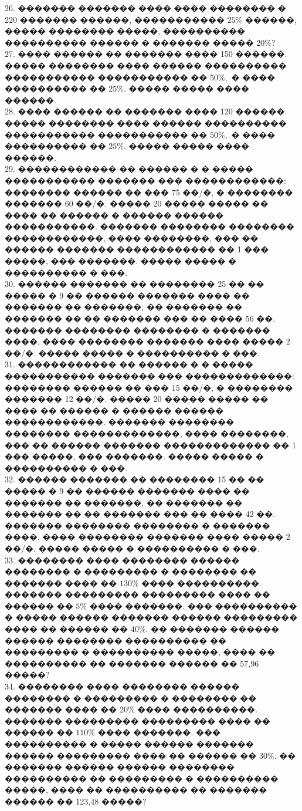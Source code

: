 \documentclass[12pt]{article}
\begin{document}
26. ������� ������� ���� ���� �������� � 220 ������� ������, ����������� $25\%$ ������, ����� �������� �����, ���������� ���������� ������ � ������� ����� $20\%?$\\
27. ���� ������ �� ������� ���� 150 ������. ����� �������� ���� ������ ���������� ����������� ����������� �� $50\%,$ � ���� ���������� �� $25\%.$ ����� ����� ���� ������.\\
28. ���� ������ �� ������� ���� 120 ������. ����� �������� ���� ������ ���������� ����������� ����������� �� $50\%,$ � ���� ���������� �� $25\%.$ ����� ����� ���� ������.\\
29. ������������ �� ������ � � ����� ����������� ������� ��� ������������: �������� ������ �� ��� 75 ��/�, � �������� ������� 60 ��/�. ����� 20 ����� ����� �� ���� �� ������ � ������ ������ �����������. ������� �������� �������� ������������, ���� ��������, ��� �� ������ ������� ������������ �� 1 ��� �����, ��� �������. ����� ����� � ���������� � ���.\\
30. ������ ������� �� �������� 25 �� �� ����� � 9 �� ������ ������� ���� �� ������� �� �������, �� ������� �� ������� �� �� ������� ��� �� ���� 56 ��. ������� �������� �������� � ������� ����, ���� �������� ������� ���� ����� 2 ��/�. ����� ����� � ���������� � ���.\\
31. ������������ �� ������ � � ����� ����������� ������� ��� �������������: �������� ������ �� ��� 15 ��/�, � �������� ������� 12 ��/�. ����� 20 ����� ����� �� ���� �� ������ � ������ ������ ������������. ������� �������� �������� �������������, ���� ��������, ��� �� ������ ������� ������������� �� 1 ��� �����, ��� �������. ����� ����� � ���������� � ���.\\
32. ������ ������� �� �������� 15 �� �� ����� � 9 �� ������ ������� ���� �� ������� �� �������, �� ������� �� ������� �� �� ������� ��� �� ���� 42 ��. ������� �������� �������� � ������� ����, ���� �������� ������� ���� ����� 2 ��/�. ����� ����� � ���������� � ���.\\
33. �������� ���� �������� ������ �������� � ��������� � �������� �� ������� ���� �� $130\%$ ���� ����������. ������� ��������� ��������� ���� �� ������ �� $5\%$ ���� �������. ��� ���������� � ����� ������ ������� ������ ��������� ���� �� ������ �� $40\%.$ �� ������� ������ ������ �������� ���������� �� ��������� � ���������� �����, ���� �� ���������� �� ������� ������ �� 57,96 �����?\\
34. �������� ���� �������� ������ �������� � ��������� � �������� �� ������� ���� �� $20\%$ ���� ����������. ������� ��������� ��������� ���� �� ������ �� $110\%$ ���� �������. ��� ���������� � ����� ������ ������� ������ ��������� ���� �� ������ �� $30\%.$ �� ������� ������ ������ �������� ���������� �� ��������� � ���������� �����, ���� �� ���������� �� ������� ������ �� 123,48 �����?\\
\end{document}
